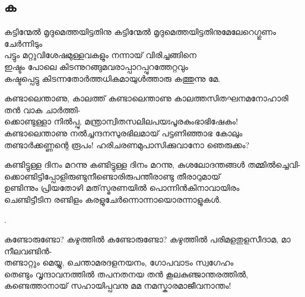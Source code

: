 \subsection{ക}

\begin{enumerate}

\begin{slokam}{\VSv}{\Naduv}{കട്ടിന്മേൽ മൃദുമെത്തയിട്ടതിനു}
കട്ടിന്മേൽ മൃദുമെത്തയിട്ടതിനുമേലേറെഗ്ഗുണം ചേർന്നിടും\\
പട്ടും മറ്റുവിശേഷമുള്ളവകളും നന്നായ്‌ വിരിച്ചങ്ങിനെ\\
ഇഷ്ടം പോലെ കിടന്നുറങ്ങുമവരാപ്പാറപ്പുറത്തേറ്റവും\\
കഷ്ടപ്പെട്ടു കിടന്നതോർത്തധികമായുള്‍ത്താരു കത്തുന്നു മേ.
\end{slokam}




\begin{slokam}{\VSr}{\VKG}{കണ്ടാലെന്താണു, കാലത്ത്}
കണ്ടാലെന്താണു കാലത്തസിതഘനമനോഹാരി തൻ വാക ചാർത്തി-\\
ക്കൊണ്ടുള്ളാ നിൽപ്പു, മന്ത്രാന്വിതസലിലപയഃപൂരകുംഭാഭിഷേകം! \\
കണ്ടാലെന്താണു നൽച്ചന്ദനസുരഭിലമായ് പട്ടണിഞ്ഞാഭ കോലും \\
തണ്ടാർക്കണ്ണന്റെ രൂപം! ഹരിചരണമുപാസിക്കുവാനോ ഞെരുക്കം?
\end{slokam}


\begin{slokam}{\VSv}{\PG}{കണ്ടിട്ടുള്ള ദിനം മറന്നു}
കണ്ടിട്ടുള്ള ദിനം മറന്നു, കുശലോദന്തങ്ങള്‍ തമ്മിൽച്ചെവി-\\
ക്കൊണ്ടിട്ടിപ്പോളിരുണ്ടുനീണ്ടൊരിരുപന്തീരാണ്ടു തീരാറുമായ്‌\\
ഉണ്ടിന്നും പ്രിയതോഴി മത്‌സ്മരണയിൽ പൊന്നിൻകിനാവായിരം\\
ചെണ്ടിട്ടീടിന രണ്ടിളം കരളുചേർന്നൊന്നായൊരന്നാളുകള്‍.
\end{slokam}


.

\begin{slokam}{\VSr}{\VKG}{കണ്ടോരുണ്ടോ? കഴുത്തിൽ}
കണ്ടോരുണ്ടോ? കഴുത്തിൽ പരിമളതുളസീദാമ, മാ നീലവണ്ടിൻ-\\
തണ്ടാറ്റും മെയ്യു, ചെന്താമരദളനയനം, ഗോപവാടം സ്വഗേഹം\\
തെണ്ടും വൃന്ദാവനത്തിൽ തപനതനയ തൻ കൂലകുഞ്ജാന്തരത്തിൽ,\\
കണ്ടെത്താനായ്‌ സഹായിപ്പവനു മമ നമസ്കാരമാജീവനാന്തം!
\end{slokam}


\end{enumerate}
